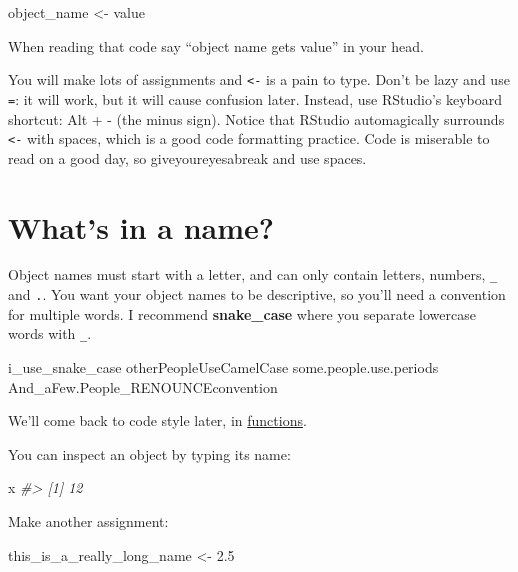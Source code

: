 \documentclass[]{book}
\newenvironment{Shaded}{\begin{snugshade}}{\end{snugshade}}
\newcommand{\FloatTok}[1]{\textcolor[rgb]{0.00,0.00,0.81}{{#1}}}
\newcommand{\StringTok}[1]{\textcolor[rgb]{0.31,0.60,0.02}{{#1}}}
\newcommand{\CommentTok}[1]{\textcolor[rgb]{0.56,0.35,0.01}{\textit{{#1}}}}
\newcommand{\NormalTok}[1]{{#1}}
\begin{document}
\begin{Shaded}
\begin{Highlighting}[]
\NormalTok{object_name <-}\StringTok{ }\NormalTok{value}
\end{Highlighting}
\end{Shaded}

When reading that code say ``object name gets value'' in your head.

You will make lots of assignments and \texttt{\textless{}-} is a pain to
type. Don't be lazy and use \texttt{=}: it will work, but it will cause
confusion later. Instead, use RStudio's keyboard shortcut: Alt + - (the
minus sign). Notice that RStudio automagically surrounds
\texttt{\textless{}-} with spaces, which is a good code formatting
practice. Code is miserable to read on a good day, so giveyoureyesabreak
and use spaces.

\section{What's in a name?}\label{whats-in-a-name}

Object names must start with a letter, and can only contain letters,
numbers, \texttt{\_} and \texttt{.}. You want your object names to be
descriptive, so you'll need a convention for multiple words. I recommend
\textbf{snake\_case} where you separate lowercase words with
\texttt{\_}.

\begin{Shaded}
\begin{Highlighting}[]
\NormalTok{i_use_snake_case}
\NormalTok{otherPeopleUseCamelCase}
\NormalTok{some.people.use.periods}
\NormalTok{And_aFew.People_RENOUNCEconvention}
\end{Highlighting}
\end{Shaded}

We'll come back to code style later, in
\protect\hyperlink{functions}{functions}.

You can inspect an object by typing its name:

\begin{Shaded}
\begin{Highlighting}[]
\NormalTok{x}
\CommentTok{#> [1] 12}
\end{Highlighting}
\end{Shaded}

Make another assignment:

\begin{Shaded}
\begin{Highlighting}[]
\NormalTok{this_is_a_really_long_name <-}\StringTok{ }\FloatTok{2.5}
\end{Highlighting}
\end{Shaded}
\end{document}
